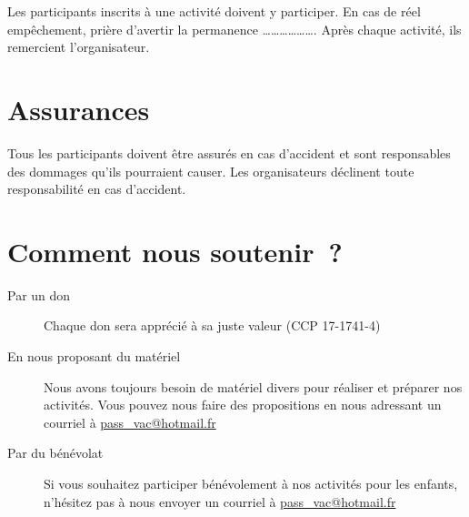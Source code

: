 Les participants inscrits à une activité doivent y participer. En cas de réel
empêchement, prière d'avertir la permanence ………………. Après chaque
activité, ils remercient l'organisateur.

\section*{Assurances}

Tous les participants doivent être assurés en cas d'accident et sont
responsables des dommages qu'ils pourraient causer. Les organisateurs
déclinent toute responsabilité en cas d'accident.

\section*{Comment nous soutenir ?}

\begin{description}
\item [Par un don]
Chaque don sera apprécié à sa juste valeur (CCP 17-1741-4)
\item [En nous proposant du matériel]
Nous avons toujours besoin de matériel divers pour réaliser et préparer
nos activités. Vous pouvez nous faire des propositions en nous adressant
un courriel à \url{pass\_vac@hotmail.fr}
\item [Par du bénévolat]
Si vous souhaitez participer bénévolement à nos activités pour les
enfants, n’hésitez pas à nous envoyer un courriel à \url{pass_vac@hotmail.fr}
\end{description}